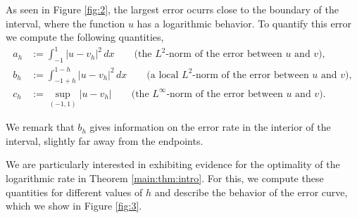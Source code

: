 \documentclass[11 pt]{article}
\numberwithin{equation}{section}
\begin{document}
As seen in Figure \ref{fig:2}, the largest error ocurrs close to the boundary of the interval, where the function $u$ has a logarithmic behavior.  To quantify this error we compute the following quantities,
\begin{align*}
 a_h&:=\int_{-1}^1 |u-v_h|^2\, dx\qquad \text{(the $L^2$-norm of the error between $u$ and $v$)},\\
 b_h&:=\int_{-1+h}^{1-h} |u-v_h|^2\, dx\qquad \text{(a local $L^2$-norm of the error between $u$ and $v$)},\\
 c_h&:=\sup_{(-1,1)} |u-v_h|\qquad \text{(the $L^\infty$-norm of the error between $u$ and $v$)}.
\end{align*}

We remark that $b_h$ gives information on the error rate in the interior of the interval, slightly far away from the endpoints. 

We are particularly interested in exhibiting evidence for the optimality of the logarithmic rate in Theorem \ref{main:thm:intro}.  For this, we compute these quantities for different values of $h$ and describe the behavior of the error curve, which we show in Figure \ref{fig:3}.
\end{document}
